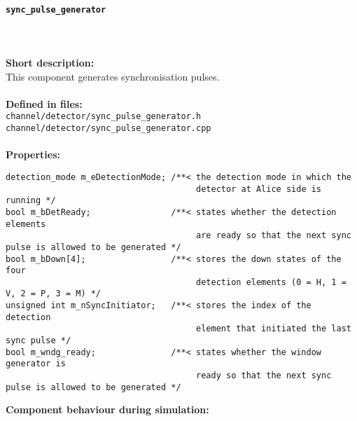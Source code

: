 \paragraph{\texttt{sync\_pulse\_generator}}
\label{par:comp_detector_syncpgen}
\noindent \\
\\
\textbf{Short description:}\\
This component generates synchronisation pulses.\\
\\
\textbf{Defined in files:}\\
\texttt{channel/detector/sync\_pulse\_generator.h}\\
\texttt{channel/detector/sync\_pulse\_generator.cpp}\\
\\
\textbf{Properties:}
\begin{lstlisting}
detection_mode m_eDetectionMode; /**< the detection mode in which the
                                      detector at Alice side is running */
bool m_bDetReady;                /**< states whether the detection elements
                                      are ready so that the next sync pulse is allowed to be generated */
bool m_bDown[4];                 /**< stores the down states of the four
                                      detection elements (0 = H, 1 = V, 2 = P, 3 = M) */
unsigned int m_nSyncInitiator;   /**< stores the index of the detection
                                      element that initiated the last sync pulse */
bool m_wndg_ready;               /**< states whether the window generator is
                                      ready so that the next sync pulse is allowed to be generated */
\end{lstlisting}
\noindent
\textbf{Component behaviour during simulation:}
